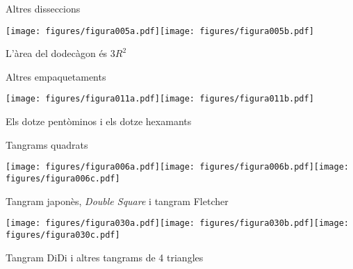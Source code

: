 \documentclass[14pt]{beamer}
\begin{document}
    \begin{frame}{Altres disseccions}
        \begin{center}
            \texttt{[image: figures/figura005a.pdf]}\qquad\texttt{[image: figures/figura005b.pdf]} \\

            \bigskip

            L'àrea del dodecàgon és $3R^2$
        \end{center}
    \end{frame}

    \begin{frame}{Altres empaquetaments}
        \begin{center}
            \texttt{[image: figures/figura011a.pdf]}\qquad\texttt{[image: figures/figura011b.pdf]} \\

            \bigskip

            Els dotze pentòminos i els dotze hexamants
        \end{center}
    \end{frame}

    \begin{frame}{Tangrams quadrats}
        \begin{center}
            \texttt{[image: figures/figura006a.pdf]}\qquad\texttt{[image: figures/figura006b.pdf]}\qquad\texttt{[image: figures/figura006c.pdf]}\\

            \bigskip

            Tangram japonès, \emph{Double Square} i tangram Fletcher

            \bigskip

            \texttt{[image: figures/figura030a.pdf]}\qquad\texttt{[image: figures/figura030b.pdf]}\qquad\texttt{[image: figures/figura030c.pdf]}\\

            \bigskip

             Tangram DiDi i altres tangrams de 4 triangles
        \end{center}
    \end{frame}
\end{document}
